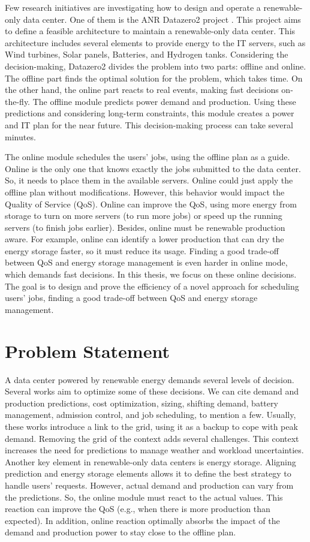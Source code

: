Few research initiatives are investigating how to design and operate a renewable-only data center. One of them is the ANR Datazero2 project \cite{Datazero}. This project aims to define a feasible architecture to maintain a renewable-only data center. This architecture includes several elements to provide energy to the IT servers, such as Wind turbines, Solar panels, Batteries, and Hydrogen tanks. Considering the decision-making, Datazero2 divides the problem into two parts: offline and online. The offline part finds the optimal solution for the problem, which takes time. On the other hand, the online part reacts to real events, making fast decisions on-the-fly. The offline module predicts power demand and production. Using these predictions and considering long-term constraints, this module creates a power and IT plan for the near future. This decision-making process can take several minutes.

The online module schedules the users' jobs, using the offline plan as a guide. Online is the only one that knows exactly the jobs submitted to the data center. So, it needs to place them in the available servers. Online could just apply the offline plan without modifications. However, this behavior would impact the Quality of Service (QoS). Online can improve the QoS, using more energy from storage to turn on more servers (to run more jobs) or speed up the running servers (to finish jobs earlier). Besides, online must be renewable production aware. For example, online can identify a lower production that can dry the energy storage faster, so it must reduce its usage. Finding a good trade-off between QoS and energy storage management is even harder in online mode, which demands fast decisions. In this thesis, we focus on these online decisions. The goal is to design and prove the efficiency of a novel approach for scheduling users' jobs, finding a good trade-off between QoS and energy storage management.

\section{Problem Statement}

A data center powered by renewable energy demands several levels of decision. Several works aim to optimize some of these decisions. We can cite demand and production predictions, cost optimization, sizing, shifting demand, battery management, admission control, and job scheduling, to mention a few. Usually, these works introduce a link to the grid, using it as a backup to cope with peak demand. Removing the grid of the context adds several challenges. This context increases the need for predictions to manage weather and workload uncertainties. Another key element in renewable-only data centers is energy storage. Aligning prediction and energy storage elements allows it to define the best strategy to handle users' requests. However, actual demand and production can vary from the predictions. So, the online module must react to the actual values. This reaction can improve the QoS (e.g., when there is more production than expected). In addition, online reaction optimally absorbs the impact of the demand and production power to stay close to the offline plan.

